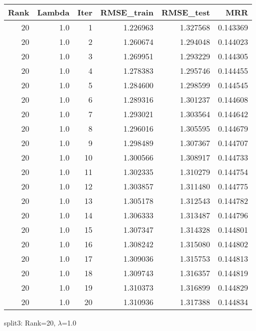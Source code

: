 \begin{tabular}{rrrrrr}
\toprule
 Rank &  Lambda &  Iter &  RMSE\_train &  RMSE\_test &       MRR \\
\midrule
   20 &     1.0 &     1 &    1.226963 &   1.327568 &  0.143369 \\
   20 &     1.0 &     2 &    1.260674 &   1.294048 &  0.144023 \\
   20 &     1.0 &     3 &    1.269951 &   1.293229 &  0.144305 \\
   20 &     1.0 &     4 &    1.278383 &   1.295746 &  0.144455 \\
   20 &     1.0 &     5 &    1.284600 &   1.298599 &  0.144545 \\
   20 &     1.0 &     6 &    1.289316 &   1.301237 &  0.144608 \\
   20 &     1.0 &     7 &    1.293021 &   1.303564 &  0.144642 \\
   20 &     1.0 &     8 &    1.296016 &   1.305595 &  0.144679 \\
   20 &     1.0 &     9 &    1.298489 &   1.307367 &  0.144707 \\
   20 &     1.0 &    10 &    1.300566 &   1.308917 &  0.144733 \\
   20 &     1.0 &    11 &    1.302335 &   1.310279 &  0.144754 \\
   20 &     1.0 &    12 &    1.303857 &   1.311480 &  0.144775 \\
   20 &     1.0 &    13 &    1.305178 &   1.312543 &  0.144782 \\
   20 &     1.0 &    14 &    1.306333 &   1.313487 &  0.144796 \\
   20 &     1.0 &    15 &    1.307347 &   1.314328 &  0.144801 \\
   20 &     1.0 &    16 &    1.308242 &   1.315080 &  0.144802 \\
   20 &     1.0 &    17 &    1.309036 &   1.315753 &  0.144813 \\
   20 &     1.0 &    18 &    1.309743 &   1.316357 &  0.144819 \\
   20 &     1.0 &    19 &    1.310373 &   1.316899 &  0.144829 \\
   20 &     1.0 &    20 &    1.310936 &   1.317388 &  0.144834 \\
\bottomrule
\end{tabular}

\caption{split3: Rank=20, $\lambda$=1.0}
